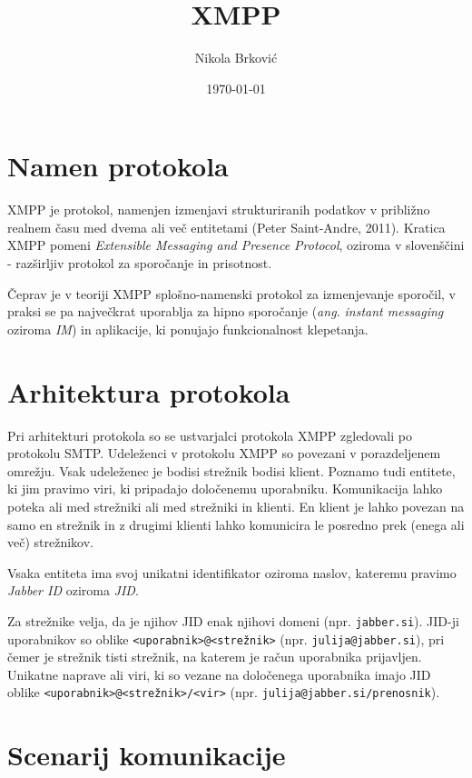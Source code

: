 \documentclass[11pt]{article}
\author{Nikola Brković}
\date{\today}
\title{XMPP}
\begin{document}
\maketitle

\section{Namen protokola}
\label{sec:org207ef1e}

XMPP je protokol, namenjen izmenjavi strukturiranih podatkov v
približno realnem času med dvema ali več entitetami
(Peter Saint-Andre, 2011). Kratica XMPP pomeni \emph{Extensible Messaging and
Presence Protocol}, oziroma v slovenščini - razširljiv protokol za
sporočanje in prisotnost.

Čeprav je v teoriji XMPP splošno-namenski protokol za izmenjevanje
sporočil, v praksi se pa največkrat uporablja za hipno sporočanje
(\emph{ang.} \emph{instant messaging} oziroma \emph{IM}) in aplikacije, ki ponujajo
funkcionalnost klepetanja.

\section{Arhitektura protokola}
\label{sec:orgfec76b4}

Pri arhitekturi protokola so se ustvarjalci protokola XMPP zgledovali
po protokolu SMTP. Udeleženci v protokolu XMPP so povezani v
porazdeljenem omrežju. Vsak udeleženec je bodisi strežnik bodisi
klient. Poznamo tudi entitete, ki jim pravimo viri, ki pripadajo
določenemu uporabniku. Komunikacija lahko poteka ali med strežniki ali
med strežniki in klienti. En klient je lahko povezan na samo en
strežnik in z drugimi klienti lahko komunicira le posredno prek (enega
ali več) strežnikov.

Vsaka entiteta ima svoj unikatni identifikator oziroma naslov,
kateremu pravimo \emph{Jabber ID} oziroma \emph{JID}.

Za strežnike velja, da je njihov JID enak njihovi domeni
(npr. \texttt{jabber.si}).  JID-ji uporabnikov so oblike
\texttt{<uporabnik>@<strežnik>} (npr. \texttt{julija@jabber.si}), pri čemer je
strežnik tisti strežnik, na katerem je račun uporabnika
prijavljen. Unikatne naprave ali viri, ki so vezane na določenega
uporabnika imajo JID oblike \texttt{<uporabnik>@<strežnik>/<vir>}
(npr. \texttt{julija@jabber.si/prenosnik}).

\section{Scenarij komunikacije}
\label{sec:org5c2cec1}
\end{document}
